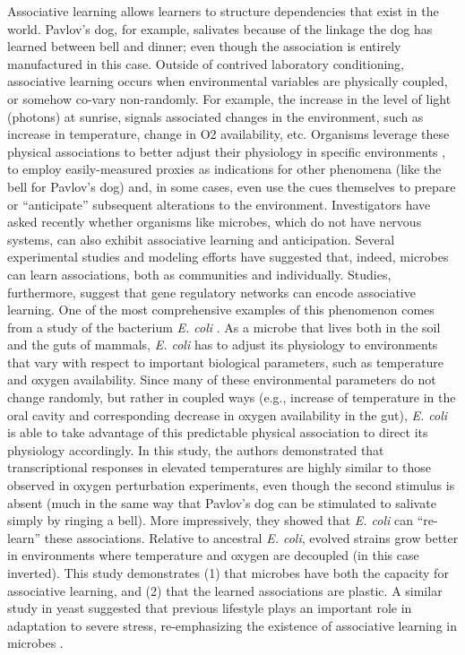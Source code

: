 Associative learning allows learners to structure dependencies that exist in the world. Pavlov’s dog, for example, salivates because of the linkage the dog has learned between bell and dinner; even though the association is entirely manufactured in this case. Outside of contrived laboratory conditioning, associative learning occurs when environmental variables are physically coupled, or somehow co-vary non-randomly. For example, the increase in the level of light (photons) at sunrise, signals associated changes in the environment, such as increase in temperature, change in O2 availability, etc. Organisms leverage these physical associations to better adjust their physiology in specific environments \cite{bonneau_predictive_2007}, to employ easily-measured proxies as indications for other phenomena (like the bell for Pavlov’s dog) and, in some cases, even use the cues themselves to prepare or ``anticipate'' subsequent alterations to the environment. Investigators have asked recently whether organisms like microbes, which do not have nervous systems, can also exhibit associative learning and anticipation.
Several experimental studies and modeling efforts have suggested that, indeed, microbes can learn associations, both as communities and individually. Studies, furthermore, suggest that gene regulatory networks can encode associative learning. One of the most comprehensive examples of this phenomenon comes from a study of the bacterium \textit{E. coli} \cite{tagkopoulos_predictive_2008}. As a microbe that lives both in the soil and the guts of mammals, \textit{E. coli} has to adjust its physiology to environments that vary with respect to important biological parameters, such as temperature and oxygen availability. Since many of these environmental parameters do not change randomly, but rather in coupled ways (e.g., increase of temperature in the oral cavity and corresponding decrease in oxygen availability in the gut), \textit{E. coli} is able to take advantage of this predictable physical association to direct its physiology accordingly. In this study, the authors demonstrated that transcriptional responses in elevated temperatures are highly similar to those observed in oxygen perturbation experiments, even though the second stimulus is absent (much in the same way that Pavlov’s dog can be stimulated to salivate simply by ringing a bell). More impressively, they showed that \textit{E. coli} can ``re-learn'' these associations. Relative to ancestral \textit{E. coli}, evolved strains grow better in environments where temperature and oxygen are decoupled (in this case inverted). This study demonstrates (1) that microbes have both the capacity for associative learning, and (2) that the learned associations are plastic. A similar study in yeast suggested that previous lifestyle plays an important role in adaptation to severe stress, re-emphasizing the existence of associative learning in microbes \cite{berry_multiple_2011}.

